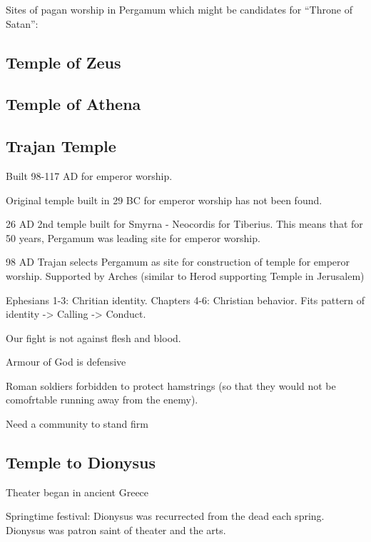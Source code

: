 \documentclass[
]{book}
\begin{document}
Sites of pagan worship in Pergamum which might be candidates for ``Throne of Satan'':

\hypertarget{temple-of-zeus}{%
\subsection{Temple of Zeus}\label{temple-of-zeus}}

\hypertarget{temple-of-athena}{%
\subsection{Temple of Athena}\label{temple-of-athena}}

\hypertarget{trajan-temple}{%
\subsection{Trajan Temple}\label{trajan-temple}}

Built 98-117 AD for emperor worship.

Original temple built in 29 BC for emperor worship has not been found.

26 AD 2nd temple built for Smyrna - Neocordis for Tiberius. This means that for 50 years, Pergamum was leading site for emperor worship.

98 AD Trajan selects Pergamum as site for construction of temple for emperor worship. Supported by Arches (similar to Herod supporting Temple in Jerusalem)

Ephesians 1-3: Chritian identity. Chapters 4-6: Christian behavior. Fits pattern of identity -\textgreater{} Calling -\textgreater{} Conduct.

Our fight is not against flesh and blood.

Armour of God is defensive

Roman soldiers forbidden to protect hamstrings (so that they would not be comofrtable running away from the enemy).

Need a community to stand firm

\hypertarget{temple-to-dionysus}{%
\subsection{Temple to Dionysus}\label{temple-to-dionysus}}

Theater began in ancient Greece

Springtime festival: Dionysus was recurrected from the dead each spring. Dionysus was patron saint of theater and the arts.
\end{document}
